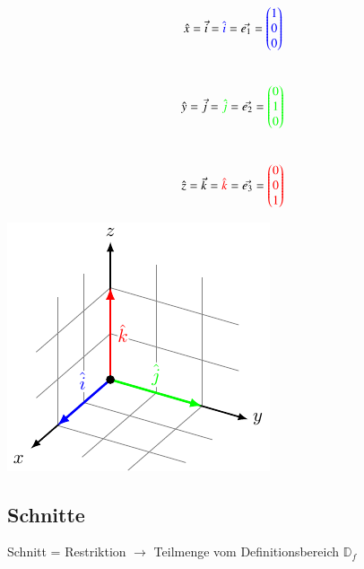 \begin{minipage}[c]{0.48\columnwidth}
    $$\hat{x}=\vec{i}={\color{blue}\hat{i}}=\vec{{e}_1}=
{\color{blue}\begin{pmatrix}
    1 \\
    0 \\
    0
\end{pmatrix}}$$\\
$$\hat{y}=\vec{j}={\color{green}\hat{j}}=\vec{{e}_2}=
{\color{green}\begin{pmatrix}
    0 \\
    1 \\
    0
\end{pmatrix}}$$\\
$$\hat{z}=\vec{k}={\color{red}\hat{k}}=\vec{{e}_3}=
{\color{red}\begin{pmatrix}
    0 \\
    0 \\
    1
\end{pmatrix}}$$
\end{minipage}
\hfill
\begin{minipage}[c]{0.48\columnwidth}
    \includegraphics[width=\columnwidth]{images/einheitsvektoren.pdf}
\end{minipage}

\subsection{Schnitte}
Schnitt = Restriktion $\rightarrow$ Teilmenge vom Definitionsbereich ${\mathbb{D}_f}$


